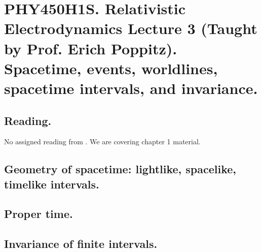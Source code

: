 
%

\chapter{PHY450H1S.  Relativistic Electrodynamics Lecture 3 (Taught by Prof. Erich Poppitz).  Spacetime, events, worldlines, spacetime intervals, and invariance.}
\label{chap:relativisticElectrodynamicsL3}
{}
\date{Jan 13, 2011}

\beginArtNoToc

\section{Reading.}

No assigned reading from \cite{landau1980classical}.  We are covering chapter 1 material.


\section{Geometry of spacetime: lightlike, spacelike, timelike intervals.}

\section{Proper time.}

\section{Invariance of finite intervals.}

\EndArticle
